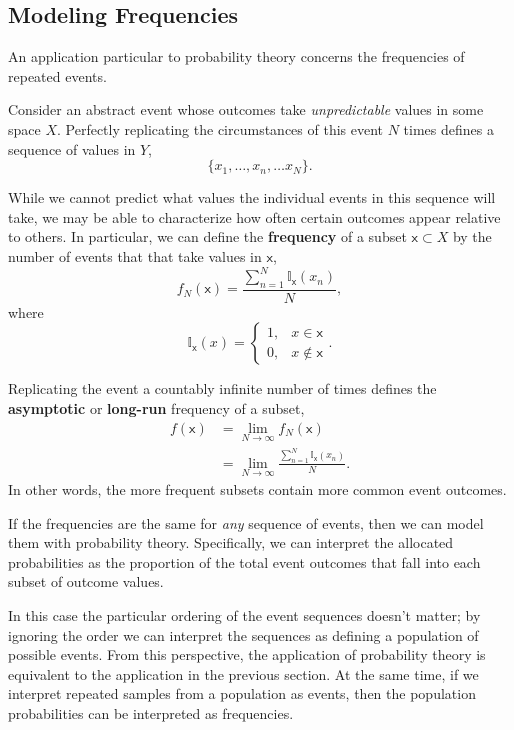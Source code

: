\documentclass[
  letterpaper,
  DIV=11,
  numbers=noendperiod]{scrartcl}
\begin{document}
\subsection{Modeling Frequencies}\label{modeling-frequencies}

An application particular to probability theory concerns the frequencies
of repeated events.

Consider an abstract event whose outcomes take \emph{unpredictable}
values in some space \(X\). Perfectly replicating the circumstances of
this event \(N\) times defines a sequence of values in \(Y\), \[
\{ x_{1}, \ldots, x_{n}, \ldots x_{N} \}.
\]

While we cannot predict what values the individual events in this
sequence will take, we may be able to characterize how often certain
outcomes appear relative to others. In particular, we can define the
\textbf{frequency} of a subset \(\mathsf{x} \subset X\) by the number of
events that that take values in \(\mathsf{x}\), \[
f_{N}(\mathsf{x})
= \frac{ \sum_{n = 1}^{N} \mathbb{I}_{\mathsf{x}}(x_{n}) }{N},
\] where \[
\mathbb{I}_{\mathsf{x}}(x)
=
\left\{
\begin{array}{rr}
1, & x \in \mathsf{x} \\
0, & x \notin \mathsf{x}
\end{array}
\right. .
\]

Replicating the event a countably infinite number of times defines the
\textbf{asymptotic} or \textbf{long-run} frequency of a subset,
\begin{align*}
f(\mathsf{x})
&=
\lim_{N \rightarrow \infty} f_{N}(\mathsf{x})
\\
&=
\lim_{N \rightarrow \infty}
\frac{ \sum_{n = 1}^{N} \mathbb{I}_{\mathsf{x}}(x_{n}) }{N}.
\end{align*} In other words, the more frequent subsets contain more
common event outcomes.

If the frequencies are the same for \emph{any} sequence of events, then
we can model them with probability theory. Specifically, we can
interpret the allocated probabilities as the proportion of the total
event outcomes that fall into each subset of outcome values.

In this case the particular ordering of the event sequences doesn't
matter; by ignoring the order we can interpret the sequences as defining
a population of possible events. From this perspective, the application
of probability theory is equivalent to the application in the previous
section. At the same time, if we interpret repeated samples from a
population as events, then the population probabilities can be
interpreted as frequencies.
\end{document}
